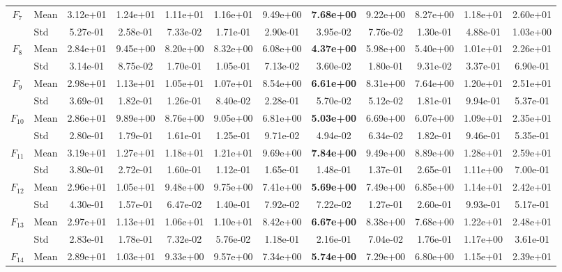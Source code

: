 \begin{center}
\begin{longtable}{clcccccccccc}
\midrule
$F_{7}$ & Mean & 3.12e+01 & 1.24e+01 & 1.11e+01 & 1.16e+01 & 9.49e+00 & \textbf{7.68e+00} & 9.22e+00 & 8.27e+00 & 1.18e+01 & 2.60e+01 \\
 & Std & 5.27e-01 & 2.58e-01 & 7.33e-02 & 1.71e-01 & 2.90e-01 & 3.95e-02 & 7.76e-02 & 1.30e-01 & 4.88e-01 & 1.03e+00 \\
\midrule
$F_{8}$ & Mean & 2.84e+01 & 9.45e+00 & 8.20e+00 & 8.32e+00 & 6.08e+00 & \textbf{4.37e+00} & 5.98e+00 & 5.40e+00 & 1.01e+01 & 2.26e+01 \\
 & Std & 3.14e-01 & 8.75e-02 & 1.70e-01 & 1.05e-01 & 7.13e-02 & 3.60e-02 & 1.80e-01 & 9.31e-02 & 3.37e-01 & 6.90e-01 \\
\midrule
$F_{9}$ & Mean & 2.98e+01 & 1.13e+01 & 1.05e+01 & 1.07e+01 & 8.54e+00 & \textbf{6.61e+00} & 8.31e+00 & 7.64e+00 & 1.20e+01 & 2.51e+01 \\
 & Std & 3.69e-01 & 1.82e-01 & 1.26e-01 & 8.40e-02 & 2.28e-01 & 5.70e-02 & 5.12e-02 & 1.81e-01 & 9.94e-01 & 5.37e-01 \\
\midrule
$F_{10}$ & Mean & 2.86e+01 & 9.89e+00 & 8.76e+00 & 9.05e+00 & 6.81e+00 & \textbf{5.03e+00} & 6.69e+00 & 6.07e+00 & 1.09e+01 & 2.35e+01 \\
 & Std & 2.80e-01 & 1.79e-01 & 1.61e-01 & 1.25e-01 & 9.71e-02 & 4.94e-02 & 6.34e-02 & 1.82e-01 & 9.46e-01 & 5.35e-01 \\
\midrule
$F_{11}$ & Mean & 3.19e+01 & 1.27e+01 & 1.18e+01 & 1.21e+01 & 9.69e+00 & \textbf{7.84e+00} & 9.49e+00 & 8.89e+00 & 1.28e+01 & 2.59e+01 \\
 & Std & 3.80e-01 & 2.72e-01 & 1.60e-01 & 1.12e-01 & 1.65e-01 & 1.48e-01 & 1.37e-01 & 2.65e-01 & 1.11e+00 & 7.00e-01 \\
\midrule
$F_{12}$ & Mean & 2.96e+01 & 1.05e+01 & 9.48e+00 & 9.75e+00 & 7.41e+00 & \textbf{5.69e+00} & 7.49e+00 & 6.85e+00 & 1.14e+01 & 2.42e+01 \\
 & Std & 4.30e-01 & 1.57e-01 & 6.47e-02 & 1.40e-01 & 7.92e-02 & 7.22e-02 & 1.27e-01 & 2.60e-01 & 9.93e-01 & 5.17e-01 \\
\midrule
$F_{13}$ & Mean & 2.97e+01 & 1.13e+01 & 1.06e+01 & 1.10e+01 & 8.42e+00 & \textbf{6.67e+00} & 8.38e+00 & 7.68e+00 & 1.22e+01 & 2.48e+01 \\
 & Std & 2.83e-01 & 1.78e-01 & 7.32e-02 & 5.76e-02 & 1.18e-01 & 2.16e-01 & 7.04e-02 & 1.76e-01 & 1.17e+00 & 3.61e-01 \\
\midrule
$F_{14}$ & Mean & 2.89e+01 & 1.03e+01 & 9.33e+00 & 9.57e+00 & 7.34e+00 & \textbf{5.74e+00} & 7.29e+00 & 6.80e+00 & 1.15e+01 & 2.39e+01 \\

\end{longtable}
\end{center}
